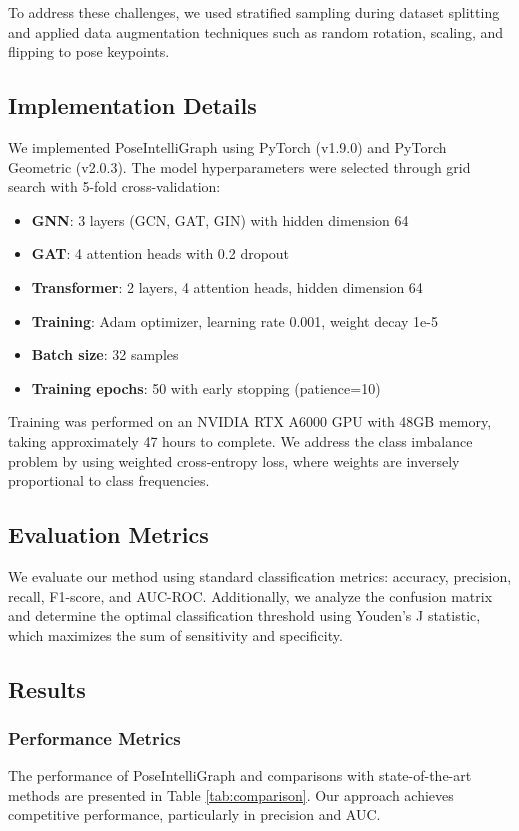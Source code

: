 \documentclass[conference]{IEEEtran}
\begin{document}
To address these challenges, we used stratified sampling during dataset
splitting and applied data augmentation techniques such as random rotation,
scaling, and flipping to pose keypoints.

\subsection{Implementation Details}
We implemented PoseIntelliGraph using PyTorch (v1.9.0) and PyTorch Geometric
(v2.0.3). The model hyperparameters were selected through grid search with
5-fold cross-validation:

\begin{itemize}
    \item \textbf{GNN}: 3 layers (GCN, GAT, GIN) with hidden dimension 64
    \item \textbf{GAT}: 4 attention heads with 0.2 dropout
    \item \textbf{Transformer}: 2 layers, 4 attention heads, hidden dimension 64
    \item \textbf{Training}: Adam optimizer, learning rate 0.001, weight decay 1e-5
    \item \textbf{Batch size}: 32 samples
    \item \textbf{Training epochs}: 50 with early stopping (patience=10)
\end{itemize}

Training was performed on an NVIDIA RTX A6000 GPU with 48GB memory, taking
approximately 47 hours to complete. We address the class imbalance problem by
using weighted cross-entropy loss, where weights are inversely proportional to
class frequencies.

\subsection{Evaluation Metrics}
We evaluate our method using standard classification metrics: accuracy,
precision, recall, F1-score, and AUC-ROC. Additionally, we analyze the
confusion matrix and determine the optimal classification threshold using
Youden's J statistic, which maximizes the sum of sensitivity and specificity.

\subsection{Results}

\subsubsection{Performance Metrics}
The performance of PoseIntelliGraph and comparisons with state-of-the-art
methods are presented in Table \ref{tab:comparison}. Our approach achieves
competitive performance, particularly in precision and AUC.
\end{document}
